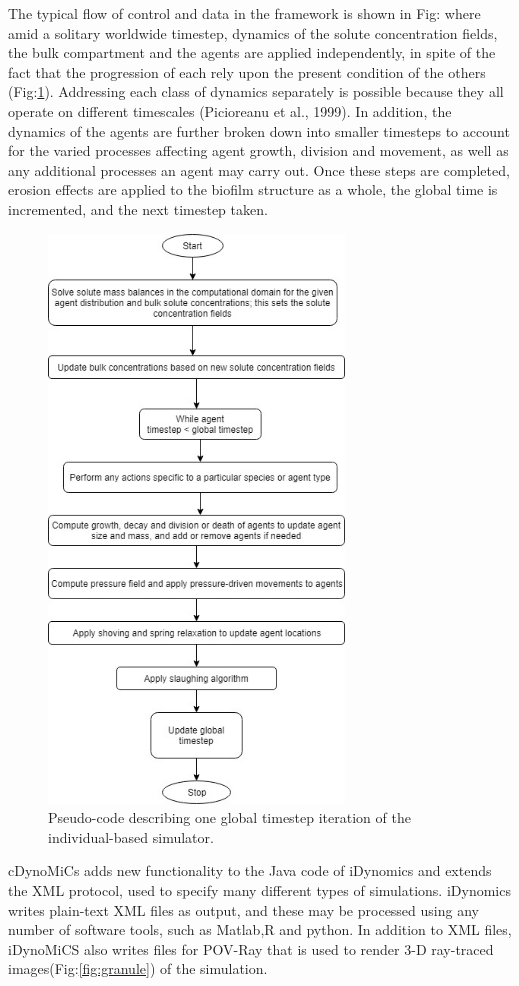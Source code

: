 The typical flow of control and data in the framework is shown in Fig: where amid a solitary worldwide timestep, dynamics of the solute concentration fields, the bulk compartment and the agents are applied independently, in spite of the fact that the progression of each rely upon the present condition of the others (Fig:\ref{fig:algo}). Addressing each class of dynamics separately is possible because they all operate on different timescales (Picioreanu et al., 1999). In addition, the dynamics of the agents are further broken down into smaller timesteps to account for the varied processes affecting agent growth, division and movement, as well as any additional processes an agent may carry out. Once these steps are completed, erosion effects are applied to the biofilm structure as a whole, the global time is incremented, and the next timestep taken.
\begin{figure}[htbp]
\centering
\includegraphics[width=0.7\textwidth]{images/algo.jpg}
\caption{ Pseudo-code describing one global timestep iteration of the individual-based simulator.}
\label{fig:algo}
\end{figure}
cDynoMiCs adds new functionality to the Java code of iDynomics and extends the XML protocol, used to specify many different types of simulations. iDynomics writes plain-text XML files as output, and these may be processed using any number of software tools, such as Matlab,R and python. In addition to XML files, iDynoMiCS also writes files for POV-Ray that is used to render 3-D ray-traced images(Fig:\ref{fig:granule}) of the simulation.


